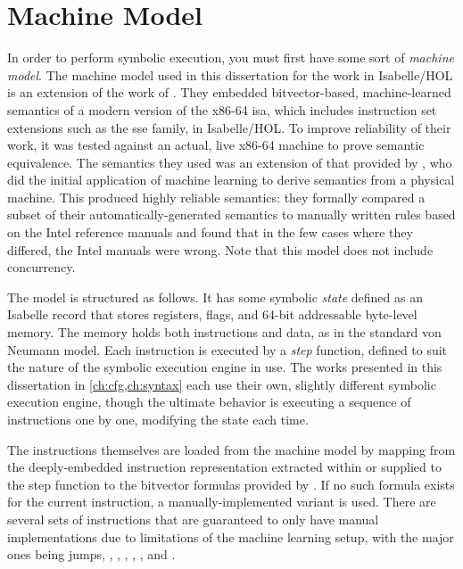 \section{Machine Model}\label{se:machine_model}
In order to perform symbolic execution,
you must first have some sort of \emph{machine model}.%
The machine model used in this dissertation for the work in Isabelle/HOL
is an extension of the work of \citet{roessle2019}.
They embedded bitvector-based, machine-learned semantics
of a modern version of the x86-64 \ac{isa},
which includes instruction set extensions such as the \ac{sse} family, in Isabelle/HOL.
To improve reliability of their work,
it was tested against an actual, live x86-64 machine to prove semantic equivalence.
The semantics they used was an extension of that provided by \citet{heule2016stratified},
who did the initial application of machine learning
to derive semantics from a physical machine.
This produced highly reliable semantics:
they formally compared a subset of their automatically-generated semantics
to manually written rules based on the Intel reference manuals
and found that in the few cases where they differed, the Intel manuals were wrong.
Note that this model does not include concurrency.

The model is structured as follows.
It has some symbolic \emph{state} defined as an Isabelle record
that stores registers, flags, and 64-bit addressable byte-level memory.
The memory holds both instructions and data, as in the standard von Neumann model.%
Each instruction is executed by a \emph{step} function,%
defined to suit the nature of the symbolic execution engine in use.
The works presented in this dissertation in \cref{ch:cfg,ch:syntax}
each use their own, slightly different symbolic execution engine,
though the ultimate behavior is executing a sequence of instructions one by one,
modifying the state each time.

The instructions themselves are loaded from the machine model
by mapping from the deeply-embedded instruction representation
extracted within or supplied to the step function
to the bitvector formulas provided by \citet{roessle2019}.
If no such formula exists for the current instruction,
a manually-implemented variant is used.
There are several sets of instructions
that are guaranteed to only have manual implementations due to limitations
of the machine learning setup, with the major ones being
jumps, , , , ,
, and .

